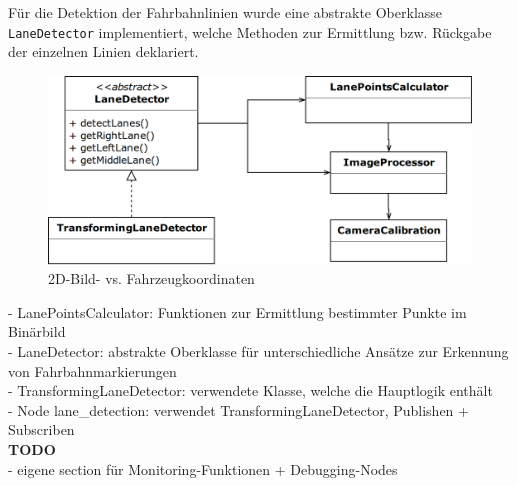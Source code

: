 F\"ur die Detektion der Fahrbahnlinien wurde eine abstrakte Oberklasse \texttt{LaneDetector} implementiert,
welche Methoden zur Ermittlung bzw. R\"uckgabe der einzelnen Linien deklariert.

\begin{figure}[h]
	\centering
	\includegraphics[width = 1.0\textwidth]{images/LaneDetectionKlassendiagramm.png}
	\caption{2D-Bild- vs. Fahrzeugkoordinaten}
	\label{fig:lanedetection}
\end{figure}

- LanePointsCalculator: Funktionen zur Ermittlung bestimmter Punkte im Bin\"arbild\\
- LaneDetector: abstrakte Oberklasse für unterschiedliche Ans\"atze zur Erkennung von Fahrbahnmarkierungen\\
- TransformingLaneDetector: verwendete Klasse, welche die Hauptlogik enth\"alt\\
- Node lane\_detection: verwendet TransformingLaneDetector, Publishen + Subscriben\\


\textbf{TODO}\\
- eigene section für Monitoring-Funktionen + Debugging-Nodes\\